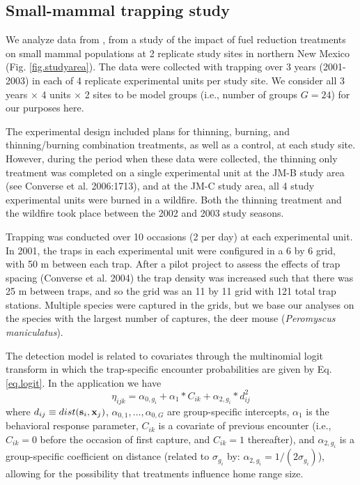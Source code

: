 \subsection{Small-mammal trapping study}

We analyze data from
\citet{converse_etal:2006jwm}, from a study of the impact of
fuel reduction treatments on small mammal populations at 2 replicate
study sites in northern New Mexico (Fig. \ref{fig.studyarea}).
The data were collected 
with 
trapping over 3 years (2001-2003) in each of 4 replicate experimental
units per study site. We consider all 3 years $\times$ 4 units
$\times$ 2 sites to be model groups  (i.e., number of groups $G = 24$)
for our purposes here.

  The experimental design included plans for
thinning, burning, and thinning/burning combination treatments, as
well as a control, at each study site. However, during the period when
these data were collected, the thinning only treatment was completed
on a single experimental unit at the JM-B study area (see Converse et
al. 2006:1713), and at the JM-C study area, all 4 study experimental
units were burned in a wildfire. Both the thinning treatment and the
wildfire took place between the 2002 and 2003 study seasons.

Trapping was conducted over 10 occasions (2 per day) at each
experimental unit.
In 2001, the traps in each
experimental unit were configured in a 6 by 6 grid, with 50 m between
each trap. After a pilot project to assess the effects of trap spacing
(Converse et al. 2004) the trap density was increased such that there
was 25 m between traps, and so the grid was an 11 by 11 grid with 121
total trap stations. Multiple species were captured in the grids, but
we base our analyses on the species with the largest number of
captures, the deer mouse ({\it Peromyscus maniculatus}).

The detection model is related to covariates through the multinomial
logit transform in which the trap-specific encounter probabilities are
given by Eq. \ref{eq.logit}.  In the application we have
\[
\eta_{ijk}=\alpha_{0,g_{i}} + \alpha_{1}*C_{ik}+\alpha_{2,g_{i}}*d_{ij}^{2} 
\]
where $d_{ij} \equiv dist({\bf s}_{i},{\bf x}_{j})$,
$\alpha_{0,1},\ldots, \alpha_{0,G}$ are group-specific intercepts,
$\alpha_{1}$ is the behavioral response parameter, $C_{ik}$ is a
covariate of previous encounter (i.e., $C_{ik} = 0$ before the
occasion of first capture, and $C_{ik} = 1$ thereafter), and
$\alpha_{2,g_{i}}$ is a group-specific coefficient on distance
(related to $\sigma_{g_{i}}$ by: $\alpha_{2,g_{i}} =
1/(2\sigma_{g_{i}})$), allowing for the possibility that treatments
influence home range size.

